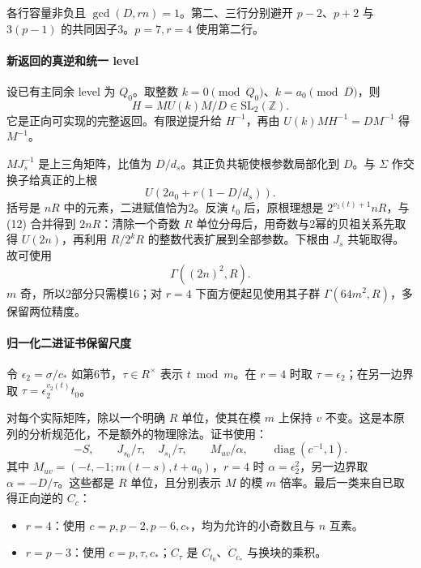 \documentclass[11pt,a4paper]{article}
\newcommand{\tightlist}{\setlength{\itemsep}{0pt}\setlength{\parskip}{0pt}}
\theoremstyle{definition}
\numberwithin{equation}{section}
\begin{document}
{各行容量非负且} \(\gcd(D,rn)=1\){。第二、三行分别避开} \(p-2\){、}\(p+2\) {与} \(3(p-1)\) {的共同因子3。}\(p=7,r=4\) {使用第二行。}

\paragraph*{\texorpdfstring{{新返回的真逆和统一} {level}}{新返回的真逆和统一 level}}\label{C14-h103}

{设已有主同余} {level} {为} \(Q_0\){。取整数} \(k=0\pmod{Q_0}\){、}\(k=a_0\pmod D\){，则} \[
H=M U(k) M/D\in\mathrm{SL}_2(\mathbb Z).
\] {它是正向可实现的完整返回。有限逆提升给} \(H^{-1}\){，再由} \(U(k)MH^{-1}=DM^{-1}\) {得} \(M^{-1}\){。}

\(MJ_s^{-1}\) {是上三角矩阵，比值为} \(D/d_s\){。其正负共轭使根参数局部化到} \(D\){。与} \(\Sigma\) {作交换子给真正的上根} \[
U\!\left(2a_0+r(1-D/d_s)\right).\tag{C14.12}
\] {括号是} \(nR\) {中的元素，二进赋值恰为2。反演} \(t_0\) {后，原根理想是} \(2^{v_2(t)+1}nR\){，与} {(12)} {合并得到} \(2nR\){：清除一个奇数} \(R\) {单位分母后，用奇数与2幂的贝祖关系先取得} \(U(2n)\){，再利用} \(R/2^kR\) {的整数代表扩展到全部参数。下根由} \(J_s\) {共轭取得。故可使用} \[
\Gamma((2n)^2,R).
\] \(m\) {奇，所以2部分只需模16；对} \(r=4\) {下面方便起见使用其子群} \(\Gamma(64m^2,R)\){，多保留两位精度。}

\paragraph*{\texorpdfstring{{归一化二进证书保留尺度}}{归一化二进证书保留尺度}}\label{C14-h104}

{令} \(\epsilon_2=\sigma/c_*\) {如第6节，}\(\tau\in R^\times\) {表示} \(t\bmod m\){。在} \(r=4\) {时取} \(\tau=\epsilon_2\){；在另一边界取} \(\tau=\epsilon_2^{v_2(t)}t_0\){。}

{对每个实际矩阵，除以一个明确} \(R\) {单位，使其在模} \(m\) {上保持} \(v\) {不变。这是本原列的分析规范化，不是额外的物理除法。证书使用：} \[
-S,\qquad J_{s_0}/\tau,\quad J_{s_1}/\tau,\qquad
M_{uv}/\alpha,\qquad \operatorname{diag}(c^{-1},1).
\tag{C14.13}
\] {其中} \(M_{uv}=(-t,-1;m(t-s),t+a_0)\){，}\(r=4\) {时} \(\alpha=\epsilon_2^2\){，另一边界取} \(\alpha=-D/\tau\){。这些都是} \(R\) {单位，且分别表示} \(M\) {的模} \(m\) {倍率。最后一类来自已取得正向逆的} \(C_c\){：}

\begin{itemize}
\tightlist
\item
  \(r=4\){：使用} \(c=p,p-2,p-6,c_*\){，均为允许的小奇数且与} \(n\) {互素。}
\item
  \(r=p-3\){：使用} \(c=p,\tau,c_*\){；}\(C_\tau\) {是} \(C_{t_0}\){、}\(C_{c_*}\) {与换块的乘积。}
\end{itemize}
\end{document}
